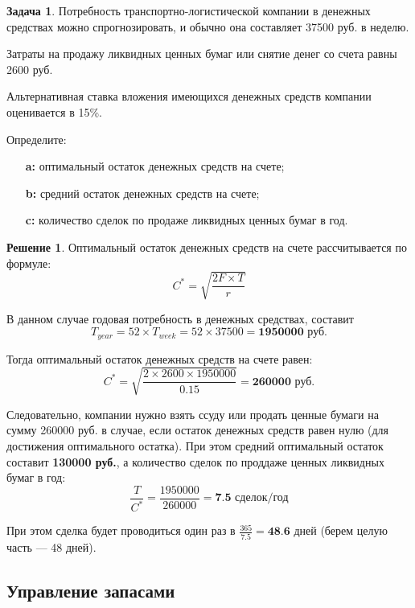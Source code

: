\documentclass[a4paper, 14pt]{article}
\theoremstyle{plain} %
\theoremstyle{definition} %
\newtheorem*{solution}{Решение}
\newtheorem{problem}{Задача}[subsection]
\theoremstyle{remark} %
\begin{document}
\begin{problem}
	Потребность  транспортно-логистической  компании  в  денежных  средствах можно спрогнозировать, и обычно она составляет 37500 руб. в неделю.

	Затраты на продажу ликвидных ценных бумаг или снятие денег со счета равны 2600 руб.

	Альтернативная ставка вложения имеющихся денежных средств компании оценивается в 15\%.

	Определите:
	\begin{itemize}
		\item[\textbf{a:}] оптимальный остаток денежных средств на счете;
		\item[\textbf{b:}] средний остаток денежных средств на счете;
		\item[\textbf{c:}] количество сделок по продаже ликвидных ценных бумаг в год.
	\end{itemize}
	\begin{solution}
		Оптимальный остаток денежных средств на счете рассчитывается по формуле:
		\[C^{*} = \sqrt{\frac{2F\times T}{r}}\]

		В данном случае годовая потребность в денежных средствах, составит
		\[T_{year} = 52\times T_{week} = 52 \times 37500 = \textbf{1950000 руб.}\]

		Тогда оптимальный остаток денежных средств на счете равен:
		\[C^{*} = \sqrt{\frac{2\times 2600\times 1950000}{0.15}} = \textbf{260000 руб.}\]

		Следовательно, компании нужно взять ссуду или продать ценные бумаги на сумму 260000 руб. в случае, если остаток денежных средств равен нулю (для достижения оптимального остатка). При этом средний оптимальный остаток составит \textbf{130000 руб.}, а количество сделок по проддаже ценных ликвидных бумаг в год:
		\[\frac{T}{C^{*}} = \frac{1950000}{260000} = \textbf{7.5 сделок/год}\]

		При этом сделка будет проводиться один раз в $\frac{365}{7.5} = \textbf{48.6 дней}$ (берем целую часть --- 48 дней).
	\end{solution}
\end{problem}

\subsection{Управление запасами}
\end{document}
